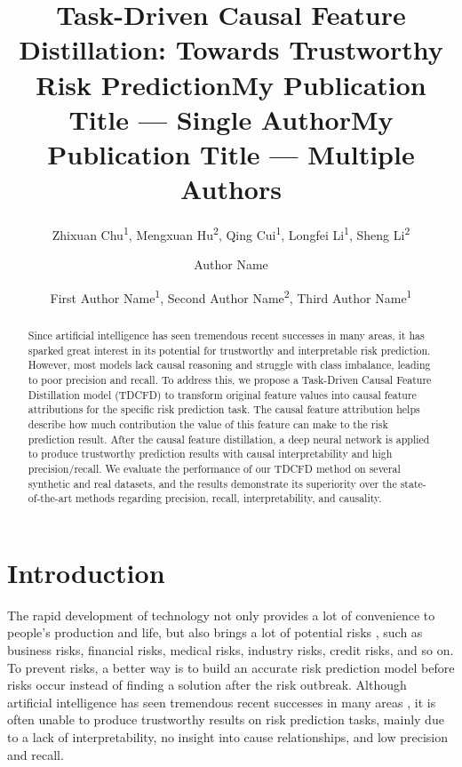 \documentclass[letterpaper]{article} %
\title{Task-Driven Causal Feature Distillation: Towards Trustworthy Risk Prediction}
\author{
Zhixuan Chu\textsuperscript{\rm 1}, Mengxuan Hu\textsuperscript{\rm 2}, Qing Cui\textsuperscript{\rm 1}, Longfei Li\textsuperscript{\rm 1}, Sheng Li\textsuperscript{\rm 2}
}
\title{My Publication Title --- Single Author}
\author {
Author Name
}
\title{My Publication Title --- Multiple Authors}
\author {
First Author Name\textsuperscript{\rm 1},
Second Author Name\textsuperscript{\rm 2},
Third Author Name\textsuperscript{\rm 1}
}
\theoremstyle{definition}
\theoremstyle{remark}
\begin{document}
\maketitle


\begin{abstract}

Since artificial intelligence has seen tremendous recent successes in many areas, it has sparked great interest in its potential for trustworthy and interpretable risk prediction. However, most models lack causal reasoning and struggle with class imbalance, leading to poor precision and recall. To address this, we propose a Task-Driven Causal Feature Distillation model (TDCFD) to transform original feature values into causal feature attributions for the specific risk prediction task. The causal feature attribution helps describe how much contribution the value of this feature can make to the risk prediction result. After the causal feature distillation, a deep neural network is applied to produce trustworthy prediction results with causal interpretability and high precision/recall. We evaluate the performance of our TDCFD method on several synthetic and real datasets, and the results demonstrate its superiority over the state-of-the-art methods regarding precision, recall, interpretability, and causality.
\end{abstract}



\section{Introduction}


The rapid development of technology not only provides a lot of convenience to people's production and life, but also brings a lot of potential risks \cite{li2022backdoor,chakraborty2018adversarial,guan2023badsam,Guan,chu2023data}, such as business risks, financial risks, medical risks, industry risks, credit risks, and so on. To prevent risks, a better way is to build an accurate risk prediction model before risks occur instead of finding a solution after the risk outbreak. Although artificial intelligence has seen tremendous recent successes in many areas \cite{luan2021review,zhu2023trustworthy,wang2023towards,shi2023aging,liu2023pharmacygpt,chen2023more}, it is often unable to produce trustworthy results on risk prediction tasks, mainly due to a lack of interpretability, no insight into cause relationships, and low precision and recall.
\end{document}
